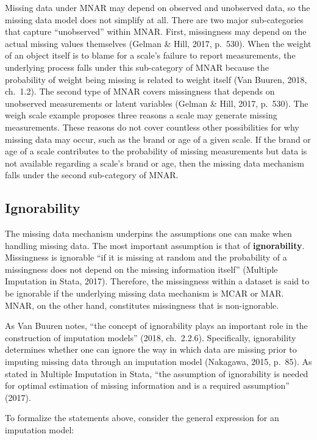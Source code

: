\documentclass[12pt,oneside]{chicagocapstone}
\begin{document}
Missing data under MNAR may depend on observed and unobserved data, so
the missing data model does not simplify at all. There are two major
sub-categories that capture ``unobserved'' within MNAR. First,
missingness may depend on the actual missing values themselves (Gelman
\& Hill, 2017, p.~530). When the weight of an object itself is to blame
for a scale's failure to report measurements, the underlying process
falls under this sub-category of MNAR because the probability of weight
being missing is related to weight itself (Van Buuren, 2018, ch.~1.2).
The second type of MNAR covers missingness that depends on unobserved
measurements or latent variables (Gelman \& Hill, 2017, p.~530). The
weigh scale example proposes three reasons a scale may generate missing
measurements. These reasons do not cover countless other possibilities
for why missing data may occur, such as the brand or age of a given
scale. If the brand or age of a scale contributes to the probability of
missing measurements but data is not available regarding a scale's brand
or age, then the missing data mechanism falls under the second
sub-category of MNAR.

\subsection*{Ignorability}\label{background-ignorability}

The missing data mechanism underpins the assumptions one can make when
handling missing data. The most important assumption is that of
\textbf{ignorability}. Missingness is ignorable ``if it is missing at
random and the probability of a missingness does not depend on the
missing information itself'' (Multiple Imputation in Stata, 2017).
Therefore, the missingness within a dataset is said to be ignorable if
the underlying missing data mechanism is MCAR or MAR. MNAR, on the other
hand, constitutes missingness that is non-ignorable.

As Van Buuren notes, ``the concept of ignorability plays an important
role in the construction of imputation models'' (2018, ch.~2.2.6).
Specifically, ignorability determines whether one can ignore the way in
which data are missing prior to imputing missing data through an
imputation model (Nakagawa, 2015, p.~85). As stated in Multiple
Imputation in Stata, ``the assumption of ignorability is needed for
optimal estimation of missing information and is a required assumption''
(2017).

To formalize the statements above, consider the general expression for
an imputation model:
\end{document}
